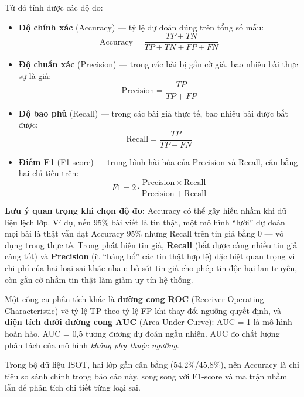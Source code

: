 Từ đó tính được các độ đo:

\begin{itemize}
    \item \textbf{Độ chính xác} (Accuracy) --- tỷ lệ dự đoán đúng trên tổng số mẫu:
    \begin{equation}
        \mathrm{Accuracy} = \frac{TP + TN}{TP + TN + FP + FN}
    \end{equation}
    \item \textbf{Độ chuẩn xác} (Precision) --- trong các bài bị gắn cờ giả, bao nhiêu bài thực sự là giả:
    \begin{equation}
        \mathrm{Precision} = \frac{TP}{TP + FP}
    \end{equation}
    \item \textbf{Độ bao phủ} (Recall) --- trong các bài giả thực tế, bao nhiêu bài được bắt được:
    \begin{equation}
        \mathrm{Recall} = \frac{TP}{TP + FN}
    \end{equation}
    \item \textbf{Điểm F1} (F1-score) --- trung bình hài hòa của Precision và Recall, cân bằng hai chỉ tiêu trên:
    \begin{equation}
        F1 = 2 \cdot \frac{\mathrm{Precision} \times \mathrm{Recall}}{\mathrm{Precision} + \mathrm{Recall}}
    \end{equation}
\end{itemize}

\textbf{Lưu ý quan trọng khi chọn độ đo:} Accuracy có thể gây hiểu nhầm khi dữ liệu lệch lớp. Ví dụ, nếu 95\% bài viết là tin thật, một mô hình ``lười'' dự đoán mọi bài là thật vẫn đạt Accuracy 95\% nhưng Recall trên tin giả bằng 0 --- vô dụng trong thực tế. Trong phát hiện tin giả, \textbf{Recall} (bắt được càng nhiều tin giả càng tốt) và \textbf{Precision} (ít ``báng bổ'' các tin thật hợp lệ) đặc biệt quan trọng vì chi phí của hai loại sai khác nhau: bỏ sót tin giả cho phép tin độc hại lan truyền, còn gắn cờ nhầm tin thật làm giảm uy tín hệ thống.

Một công cụ phân tích khác là \textbf{đường cong ROC} (Receiver Operating Characteristic) vẽ tỷ lệ TP theo tỷ lệ FP khi thay đổi ngưỡng quyết định, và \textbf{diện tích dưới đường cong AUC} (Area Under Curve): AUC = 1 là mô hình hoàn hảo, AUC = 0{,}5 tương đương dự đoán ngẫu nhiên. AUC đo chất lượng phân tách của mô hình \textit{không phụ thuộc ngưỡng}.

Trong bộ dữ liệu ISOT, hai lớp gần cân bằng (54,2\%/45,8\%), nên Accuracy là chỉ tiêu so sánh chính trong báo cáo này, song song với F1-score và ma trận nhầm lẫn để phân tích chi tiết từng loại sai.
